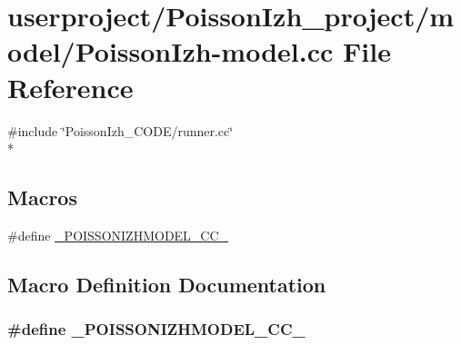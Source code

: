 \hypertarget{PoissonIzh-model_8cc}{\section{userproject/\+Poisson\+Izh\+\_\+project/model/\+Poisson\+Izh-\/model.cc File Reference}
\label{PoissonIzh-model_8cc}
}
{\ttfamily \#include \char`\"{}Poisson\+Izh\+\_\+\+C\+O\+D\+E/runner.\+cc\char`\"{}}\\*
\subsection*{Macros}
\begin{DoxyCompactItemize}
\item 
\#define \hyperlink{PoissonIzh-model_8cc_ae160364be83151609a7d609dc088be6b}{\+\_\+\+P\+O\+I\+S\+S\+O\+N\+I\+Z\+H\+M\+O\+D\+E\+L\+\_\+\+C\+C\+\_\+}
\end{DoxyCompactItemize}


\subsection{Macro Definition Documentation}
\hypertarget{PoissonIzh-model_8cc_ae160364be83151609a7d609dc088be6b}{
\subsubsection[{\+\_\+\+P\+O\+I\+S\+S\+O\+N\+I\+Z\+H\+M\+O\+D\+E\+L\+\_\+\+C\+C\+\_\+}]{\setlength{\rightskip}{0pt plus 5cm}\#define \+\_\+\+P\+O\+I\+S\+S\+O\+N\+I\+Z\+H\+M\+O\+D\+E\+L\+\_\+\+C\+C\+\_\+}}\label{PoissonIzh-model_8cc_ae160364be83151609a7d609dc088be6b}
